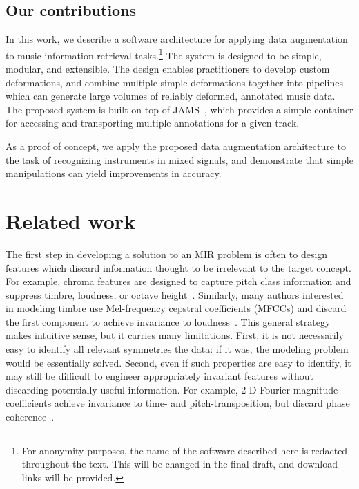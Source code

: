 \documentclass{article}
\begin{document}

\subsection{Our contributions}
In this work, we describe a software architecture for applying data augmentation to music
information retrieval tasks.\footnote{For anonymity purposes, the name of the software
    described here is redacted throughout the text.  This will be changed in the final
draft, and download links will be provided.}
The system is designed to be simple, modular, and
extensible. The design enables practitioners to develop custom deformations, and combine
multiple simple deformations together into pipelines which can generate large volumes of
reliably deformed, annotated music data.  The proposed system is built on top of
JAMS~\cite{humphreyjams}, which provides a simple container for accessing and
transporting multiple annotations for a given track.

As a proof of concept, we apply the proposed data augmentation architecture to the
task of recognizing instruments in mixed signals, and demonstrate that simple
manipulations can yield improvements in accuracy.

\section{Related work}

The first step in developing a solution to an MIR problem is often to
design features which discard information thought to be irrelevant to the target
concept.  For example, chroma features are designed to capture pitch class information
and suppress timbre, loudness, or octave height~\cite{muller2011chroma}.
Similarly, many authors interested in modeling timbre
use Mel-frequency cepstral coefficients (MFCCs) and discard the first component to
achieve invariance to loudness~\cite{pampalk2004matlab}.
This general strategy makes intuitive sense, but it carries many limitations.
First, it is not necessarily easy to identify all relevant symmetries the
data: if it was, the modeling problem would be essentially solved.
Second, even if such properties are easy to identify, it may still be difficult to
engineer appropriately invariant features without discarding potentially useful
information.  For example, 2-D Fourier magnitude coefficients achieve invariance to
time- and pitch-transposition, but discard phase coherence~\cite{ellis2012large}.
\end{document}
